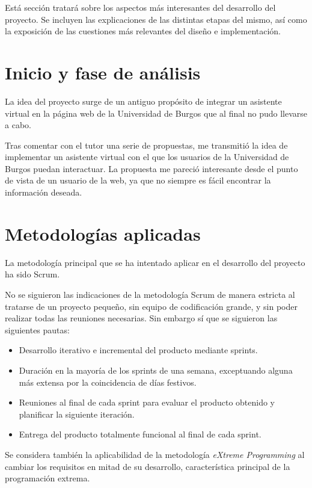 
Está sección tratará sobre los aspectos más interesantes del desarrollo del proyecto. Se incluyen las explicaciones de las distintas etapas del mismo, así como la exposición de las cuestiones más relevantes del diseño e implementación.

\section{Inicio y fase de análisis}

La idea del proyecto surge de un antiguo propósito de integrar un asistente virtual en la página web de la Universidad de Burgos que al final no pudo llevarse a cabo.

Tras comentar con el tutor una serie de propuestas, me transmitió la idea de implementar un asistente virtual con el que los usuarios de la Universidad de Burgos puedan interactuar. La propuesta me pareció interesante desde el punto de vista de un usuario de la web, ya que no siempre es fácil encontrar la información deseada.

\section{Metodologías aplicadas}

La metodología principal que se ha intentado aplicar en el desarrollo del proyecto ha sido Scrum.

No se siguieron las indicaciones de la metodología Scrum de manera estricta al tratarse de un proyecto pequeño, sin equipo de codificación grande, y sin poder realizar todas las reuniones necesarias. Sin embargo sí que se siguieron las siguientes pautas:

\begin{itemize}
\tightlist
\item
Desarrollo iterativo e incremental del producto mediante sprints.
\item
Duración en la mayoría de los sprints de una semana, exceptuando alguna más extensa por la coincidencia de días festivos.
\item
Reuniones al final de cada sprint para evaluar el producto obtenido y planificar la siguiente iteración.
\item
Entrega del producto totalmente funcional al final de cada sprint.
\end{itemize}

Se considera también la aplicabilidad de la metodología \emph{eXtreme Programming} al cambiar los requisitos en mitad de su desarrollo, característica principal de la programación extrema.

